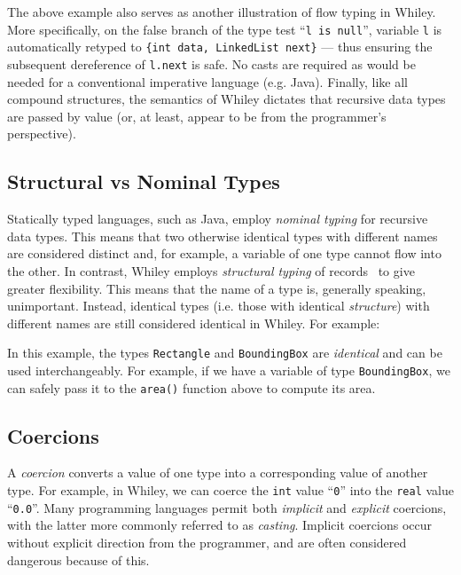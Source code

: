 The above example also serves as another illustration of flow typing
in Whiley.  More specifically, on the false branch of the type test
``\lstinline{l is null}'', variable \lstinline{l} is automatically
retyped to \lstinline+{int data, LinkedList next}+ --- thus ensuring
the subsequent dereference of \lstinline{l.next} is safe.  No casts
are required as would be needed for a conventional imperative language
(e.g. Java).  Finally, like all compound structures, the semantics of
Whiley dictates that recursive data types are passed by value (or, at
least, appear to be from the programmer's perspective).

\subsection{Structural vs Nominal Types}
Statically typed languages, such as Java, employ {\em nominal typing}
for recursive data types.  This means that two otherwise identical
types with different names are considered distinct and, for example, a
variable of one type cannot flow into the other.  In contrast, Whiley employs {\em structural typing} of records~\cite{Card88} to give greater flexibility.  This means that the name of a type is, generally speaking, unimportant.  Instead, identical types (i.e. those with identical {\em structure}) with different names are still considered identical in Whiley.  For example:



In this example, the types \lstinline{Rectangle} and \lstinline{BoundingBox} are {\em identical} and can be used interchangeably.  For example, if we have a variable of type \lstinline{BoundingBox}, we can safely pass it to the \lstinline{area()} function above to compute its area.



\subsection{Coercions}

A {\em coercion} converts a value of one type into a corresponding value of another type.  For example, in Whiley, we can coerce the \lstinline{int} value ``\lstinline{0}'' into the \lstinline{real} value ``\lstinline{0.0}''.  Many programming languages permit both {\em implicit} and {\em explicit} coercions, with the latter more commonly referred to as {\em casting}.  Implicit coercions occur without explicit direction from the programmer, and are often considered dangerous because of this.  

